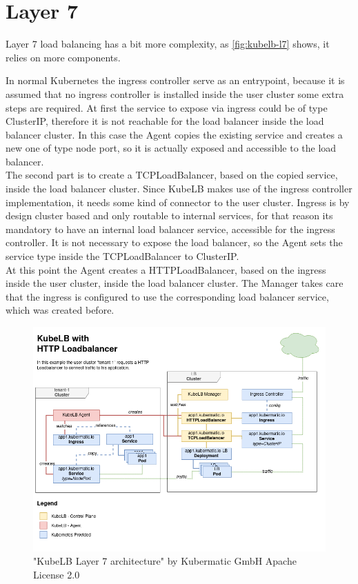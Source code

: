 \section{Layer 7}

Layer 7 load balancing has a bit more complexity, as \autoref{fig:kubelb-l7} shows, it relies on more components.

In normal Kubernetes the ingress controller serve as an entrypoint, because it is assumed that no ingress controller is installed inside the user cluster some extra steps are required.
At first the service to expose via ingress could be of type ClusterIP, therefore it is not reachable for the load balancer inside the load balancer cluster.
In this case the Agent copies the existing service and creates a new one of type node port, so it is actually exposed and accessible to the load balancer.
\\
The second part is to create a TCPLoadBalancer, based on the copied service, inside the load balancer cluster.
Since KubeLB makes use of the ingress controller implementation, it needs some kind of connector to the user cluster.
Ingress is by design cluster based and only routable to internal services, for that reason its mandatory to have an internal load balancer service, accessible for the ingress controller.
It is not necessary to expose the load balancer, so the Agent sets the service type inside the TCPLoadBalancer to ClusterIP.
\\
At this point the Agent creates a HTTPLoadBalancer, based on the ingress inside the user cluster, inside the load balancer cluster.
The Manager takes care that the ingress is configured to use the corresponding load balancer service, which was created before.

\begin{figure}[H]
    \centering
    \includegraphics[width=1\linewidth]{media/06/kubelb-l7}
    \caption{"KubeLB Layer 7 architecture" by Kubermatic GmbH Apache License 2.0}
    \label{fig:kubelb-l7}
\end{figure}

